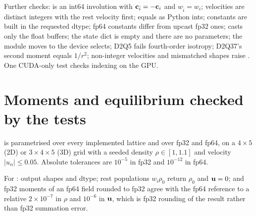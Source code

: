 Further checks:  is an int64 involution with $\mathbf{c}_{\bar i} = -\mathbf{c}_i$ and
$w_{\bar i} = w_i$; velocities are distinct integers with the rest velocity first;
 equals  as Python ints; constants are built in the requested dtype;
fp64 constants differ from upcast fp32 ones;  casts only the float
buffers; the state dict is empty and there are no parameters; the module moves to the device
 selects; D2Q5 fails fourth-order isotropy; D2Q37's second moment equals
$1/r^2$; non-integer velocities and mismatched shapes raise . One CUDA-only
test checks  indexing on the GPU.


\section{Moments and equilibrium checked by the tests}

 is parametrised over every implemented lattice and
over fp32 and fp64, on a $4\times5$ (2D) or $3\times4\times5$ (3D) grid with a seeded
density $\rho \in [1, 1.1]$ and velocity $|u_\alpha| \le 0.05$. Absolute tolerances are
$10^{-5}$ in fp32 and $10^{-12}$ in fp64.

For : output shapes and dtype; rest populations $w_i\rho_0$ return
$\rho_0$ and $\mathbf{u} = 0$; and fp32 moments of an fp64 field rounded to fp32 agree with the
fp64 reference to a relative $2\times10^{-7}$ in $\rho$ and $10^{-6}$ in $\mathbf{u}$, which is
fp32 rounding of the result rather than fp32 summation error.

